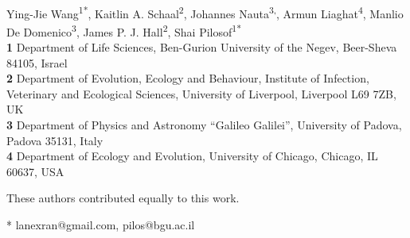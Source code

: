 \documentclass[10pt,letterpaper]{article}
\begin{document}
\vspace*{0.2in}

\begin{flushleft}
{\Large
\textbf{} %
}
\newline
\\
Ying-Jie Wang\textsuperscript{1*},
Kaitlin A. Schaal\textsuperscript{2\Yinyang},
Johannes Nauta\textsuperscript{3,\Yinyang},
Armun Liaghat\textsuperscript{4},
Manlio De Domenico\textsuperscript{3},
James P. J. Hall\textsuperscript{2},
Shai Pilosof\textsuperscript{1*}
\\
\bigskip
\textbf{1} Department of Life Sciences, Ben-Gurion University of the Negev, Beer-Sheva 84105, Israel
\\
\textbf{2} Department of Evolution, Ecology and Behaviour, Institute of Infection, Veterinary and Ecological Sciences, University of Liverpool, Liverpool L69 7ZB, UK
\\
\textbf{3} Department of Physics and Astronomy “Galileo Galilei”, University of Padova, Padova 35131, Italy
\\

\textbf{4} Department of Ecology and Evolution, University of Chicago, Chicago, IL 60637, USA
\\
\bigskip

% 
%
\Yinyang These authors contributed equally to this work.

* lanexran@gmail.com, pilos@bgu.ac.il

\end{flushleft}
\end{document}

